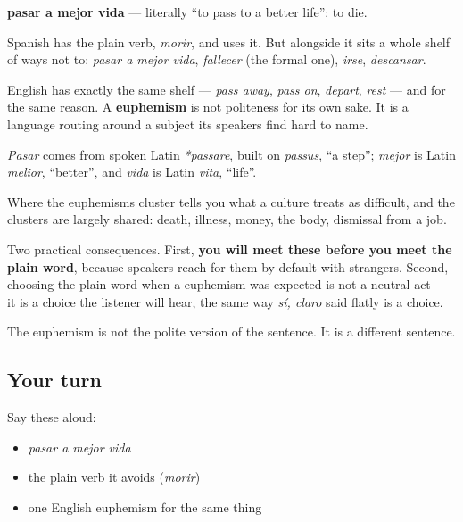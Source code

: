\begin{cousinweb}
\textbf{pasar a mejor vida} — literally \textquotedblleft{}to pass to a better life\textquotedblright{}: to die.

Spanish has the plain verb, \emph{morir}, and uses it. But alongside it sits a whole shelf of ways not to: \emph{pasar a mejor vida}, \emph{fallecer} (the formal one), \emph{irse}, \emph{descansar}.

English has exactly the same shelf — \emph{pass away}, \emph{pass on}, \emph{depart}, \emph{rest} — and for the same reason. A \textbf{euphemism} is not politeness for its own sake. It is a language routing around a subject its speakers find hard to name.

\emph{Pasar} comes from spoken Latin \emph{*passare}, built on \emph{passus}, \textquotedblleft{}a step\textquotedblright{}; \emph{mejor} is Latin \emph{melior}, \textquotedblleft{}better\textquotedblright{}, and \emph{vida} is Latin \emph{vita}, \textquotedblleft{}life\textquotedblright{}.
\end{cousinweb}

\begin{grammarlens}[title={What you've built}]
Where the euphemisms cluster tells you what a culture treats as difficult, and the clusters are largely shared: death, illness, money, the body, dismissal from a job.

Two practical consequences. First, \textbf{you will meet these before you meet the plain word}, because speakers reach for them by default with strangers. Second, choosing the plain word when a euphemism was expected is not a neutral act — it is a choice the listener will hear, the same way \emph{sí, claro} said flatly is a choice.

The euphemism is not the polite version of the sentence. It is a different sentence.
\end{grammarlens}

\subsection*{Your turn}
Say these aloud:

\begin{itemize}
\raggedright
  \item \emph{pasar a mejor vida}
  \item the plain verb it avoids (\emph{morir})
  \item one English euphemism for the same thing
\end{itemize}

